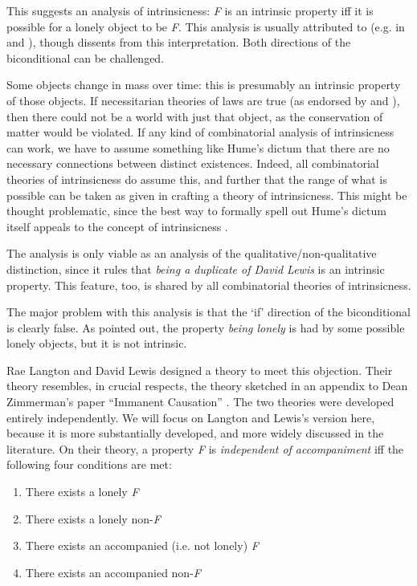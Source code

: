 This suggests an analysis of intrinsicness: \textit{F} is an intrinsic property iff it is possible for a lonely object to be \textit{F}. This analysis is usually attributed to \citet{Kim1982} (e.g. in \citet{Lewis1983b} and \citet{Sider1993-SIDAAS}), though \citet{Humberstone1996} dissents from this interpretation. Both directions of the biconditional can be challenged.

Some objects change in mass over time: this is presumably an intrinsic property of those objects. If necessitarian theories of laws are true (as endorsed by \citet{Ellis2001} and \citet{Shoemaker1984}), then there could not be a world with just that object, as the conservation of matter would be violated. If any kind of combinatorial analysis of intrinsicness can work, we have to assume something like Hume's dictum that there are no necessary connections between distinct existences. Indeed, all combinatorial theories of intrinsicness do assume this, and further that the range of what is possible can be taken as given in crafting a theory of intrinsicness. This might be thought problematic, since the best way to formally spell out Hume's dictum itself appeals to the concept of intrinsicness \cite[87-91]{Lewis1986a}.

The analysis is only viable as an analysis of the qualitative/non-qualitative distinction, since it rules that \textit{being a duplicate of David Lewis} is an intrinsic property. This feature, too, is shared by all combinatorial theories of intrinsicness.

The major problem with this analysis is that the `if' direction of the biconditional is clearly false. As \citet{Lewis1983b} pointed out, the property \textit{being lonely} is had by some possible lonely objects, but it is not intrinsic.

Rae Langton and David Lewis \citeyearpar{Lewis1998Langton} designed a theory to meet this objection. Their theory resembles, in crucial respects, the theory sketched in an appendix to Dean Zimmerman's paper ``Immanent Causation'' \citep{Zimmerman1997}. The two theories were developed entirely independently. We will focus on Langton and Lewis's version here, because it is more substantially developed, and more widely discussed in the literature. On their theory, a property \textit{F} is \textit{independent of accompaniment} iff the following four conditions are met:

\begin{enumerate}
\item There exists a lonely \textit{F} 
\item There exists a lonely non-\textit{F} 
\item There exists an accompanied (i.e. not lonely) \textit{F} 
\item There exists an accompanied non-\textit{F} 
\end{enumerate}

